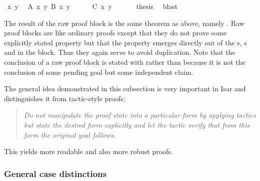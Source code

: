 \begin{isabellebody}
\ x\ y\ \isamarkupfalse%
\ {\isachardoublequote}A\ x\ y{\isachardoublequote}\ {\isachardoublequote}B\ x\ y{\isachardoublequote}\isanewline
\ \ \ \ \isamarkupfalse%
\ {\isachardoublequote}C\ x\ y{\isachardoublequote}\ \isamarkupfalse%
\ \isamarkupfalse%
\isacommand{{\isacharbraceright}}\isanewline
\ \ \isamarkupfalse%
\ {\isacharquery}thesis\ \isamarkupfalse%
\ blast\isanewline
\isamarkupfalse%
\isamarkupfalse%
%
\begin{isamarkuptext}%
\noindent The result of the raw proof block is the same theorem
as above, namely .  Raw
proof blocks are like ordinary proofs except that they do not prove
some explicitly stated property but that the property emerges directly
out of the s, s and
 in the block. Thus they again serve to avoid
duplication. Note that the conclusion of a raw proof block is stated with
 rather than  because it is not the
conclusion of some pending goal but some independent claim.

The general idea demonstrated in this subsection is very
important in Isar and distinguishes it from tactic-style proofs:
\begin{quote}\em
Do not manipulate the proof state into a particular form by applying
tactics but state the desired form explicitly and let the tactic verify
that from this form the original goal follows.
\end{quote}
This yields more readable and also more robust proofs.

\subsubsection{General case distinctions}


\end{isamarkuptext}
\end{isabellebody}
